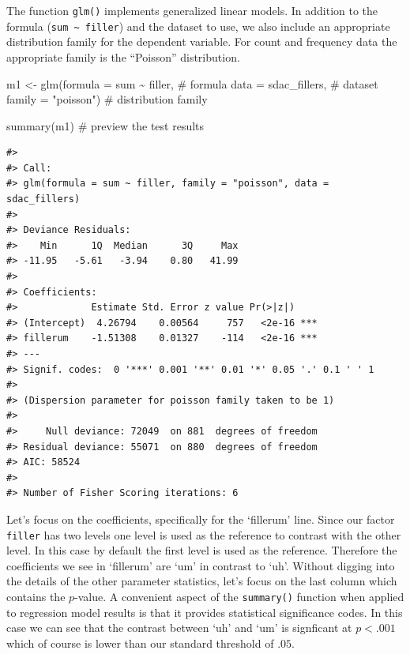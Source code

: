 \documentclass[
  letterpaper,
]{latex/krantz}
\newenvironment{Shaded}{\begin{snugshade}}{\end{snugshade}}
\newcommand{\AttributeTok}[1]{\textcolor[rgb]{0.40,0.45,0.13}{#1}}
\newcommand{\CommentTok}[1]{\textcolor[rgb]{0.37,0.37,0.37}{#1}}
\newcommand{\FunctionTok}[1]{\textcolor[rgb]{0.28,0.35,0.67}{#1}}
\newcommand{\NormalTok}[1]{\textcolor[rgb]{0.00,0.23,0.31}{#1}}
\newcommand{\OtherTok}[1]{\textcolor[rgb]{0.00,0.23,0.31}{#1}}
\newcommand{\SpecialCharTok}[1]{\textcolor[rgb]{0.37,0.37,0.37}{#1}}
\newcommand{\StringTok}[1]{\textcolor[rgb]{0.13,0.47,0.30}{#1}}
\begin{document}
The function \texttt{glm()} implements generalized linear models. In
addition to the formula (\texttt{sum\ \textasciitilde{}\ filler}) and
the dataset to use, we also include an appropriate distribution family
for the dependent variable. For count and frequency data the appropriate
family is the ``Poisson'' distribution.

\begin{Shaded}
\begin{Highlighting}[]
\NormalTok{m1 }\OtherTok{\textless{}{-}} 
  \FunctionTok{glm}\NormalTok{(}\AttributeTok{formula =}\NormalTok{ sum }\SpecialCharTok{\textasciitilde{}}\NormalTok{ filler, }\CommentTok{\# formula}
      \AttributeTok{data =}\NormalTok{ sdac\_fillers, }\CommentTok{\# dataset}
      \AttributeTok{family =} \StringTok{"poisson"}\NormalTok{) }\CommentTok{\# distribution family}

\FunctionTok{summary}\NormalTok{(m1) }\CommentTok{\# preview the test results}
\end{Highlighting}
\end{Shaded}

\begin{verbatim}
#> 
#> Call:
#> glm(formula = sum ~ filler, family = "poisson", data = sdac_fillers)
#> 
#> Deviance Residuals: 
#>    Min      1Q  Median      3Q     Max  
#> -11.95   -5.61   -3.94    0.80   41.99  
#> 
#> Coefficients:
#>             Estimate Std. Error z value Pr(>|z|)    
#> (Intercept)  4.26794    0.00564     757   <2e-16 ***
#> fillerum    -1.51308    0.01327    -114   <2e-16 ***
#> ---
#> Signif. codes:  0 '***' 0.001 '**' 0.01 '*' 0.05 '.' 0.1 ' ' 1
#> 
#> (Dispersion parameter for poisson family taken to be 1)
#> 
#>     Null deviance: 72049  on 881  degrees of freedom
#> Residual deviance: 55071  on 880  degrees of freedom
#> AIC: 58524
#> 
#> Number of Fisher Scoring iterations: 6
\end{verbatim}

Let's focus on the coefficients, specifically for the `fillerum' line.
Since our factor \texttt{filler} has two levels one level is used as the
reference to contrast with the other level. In this case by default the
first level is used as the reference. Therefore the coefficients we see
in `fillerum' are `um' in contrast to `uh'. Without digging into the
details of the other parameter statistics, let's focus on the last
column which contains the \(p\)-value. A convenient aspect of the
\texttt{summary()} function when applied to regression model results is
that it provides statistical significance codes. In this case we can see
that the contrast between `uh' and `um' is signficant at \(p < .001\)
which of course is lower than our standard threshold of \(.05\).
\end{document}
